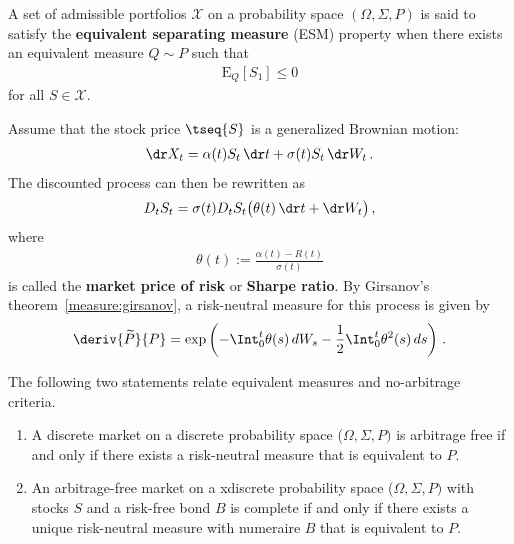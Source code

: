     \begin{definition}
        A set of admissible portfolios $\mathcal{X}$ on a probability space $(\Omega,\Sigma,P)$ is said to satisfy the \textbf{equivalent separating measure} (ESM) property when there exists an equivalent measure $Q\sim P$ such that
        \begin{gather}
            \mathrm{E}_Q[S_1]\leq 0
        \end{gather}
        for all $S\in\mathcal{X}$.
    \end{definition}

    \begin{example}
        Assume that the stock price $\tseq{S}$ is a generalized Brownian motion:
        \begin{gather}
            \dr X_t = \alpha(t)S_t\,\dr t + \sigma(t)S_t\,\dr W_t\,.
        \end{gather}
        The discounted process can then be rewritten as
        \begin{gather}
            D_tS_t = \sigma(t)D_tS_t\bigl(\theta(t)\,\dr t + \dr W_t\bigr)\,,
        \end{gather}
        where
        \begin{gather}
            \theta(t) := \frac{\alpha(t) - R(t)}{\sigma(t)}
        \end{gather}
        is called the \textbf{market price of risk} or \textbf{Sharpe ratio}. By Girsanov's theorem~\ref{measure:girsanov}, a risk-neutral measure for this process is given by
        \begin{gather}
            \deriv{\widetilde{P}}{P} = \exp\left(-\Int_0^t\theta(s)\,dW_s - \frac{1}{2}\Int_0^t\theta^2(s)\,ds\right)\,.
        \end{gather}
    \end{example}

    \begin{theorem}
        The following two statements relate equivalent measures and no-arbitrage criteria.
        \begin{enumerate}
            \item A discrete market on a discrete probability space ($\Omega,\Sigma,P)$ is arbitrage free if and only if there exists a risk-neutral measure that is equivalent to $P$.
            \item An arbitrage-free market on a xdiscrete probability space ($\Omega,\Sigma,P)$ with stocks $S$ and a risk-free bond $B$ is complete if and only if there exists a unique risk-neutral measure with numeraire $B$ that is equivalent to $P$.
        \end{enumerate}
    \end{theorem}

